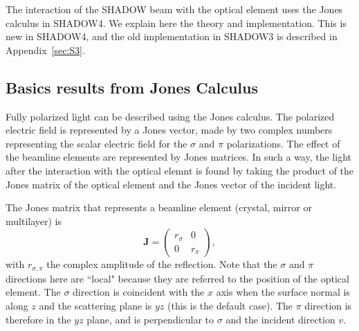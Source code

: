 \documentclass{iucr}
\begin{document}
The interaction of the SHADOW beam with the optical element  uses the Jones calculus in SHADOW4. We explain here the theory and implementation. This is new in SHADOW4, and the old implementation in SHADOW3 is described in Appendix~\ref{sec:S3}.



\subsection{Basics results from Jones Calculus}
\label{sec:Jones}

Fully polarized light can be described using the Jones calculus. The polarized electric field is represented by a Jones vector, made by two complex numbers representing the scalar electric field for the $\sigma$ and $\pi$ polarizations. 
The effect of the beamline elements are represented by Jones matrices.
In such a way, the light after the interaction with the optical elemnt is found by taking the product of the Jones matrix of the optical element and the Jones vector of the incident light. 

The Jones matrix that represents a beamline element (crystal, mirror or multilayer) is
\begin{equation}\label{eq:J}
\textbf{J} = 
\begin{pmatrix}
r_\sigma & 0\\
0 & r_\pi
\end{pmatrix},
\end{equation}
with $r_{\sigma,\pi}$ the complex amplitude of the reflection.
Note that the $\sigma$ and $\pi$ directions here are ``local" because they are referred to the position of the optical element. The $\sigma$ direction is coincident with the $x$ axis when the surface normal is along $z$ and the scattering plane is $yz$ (this is the default case). The $\pi$ direction is therefore in the $yz$ plane, and is perpendicular to $\sigma$ and the incident direction $v$.
\end{document}
